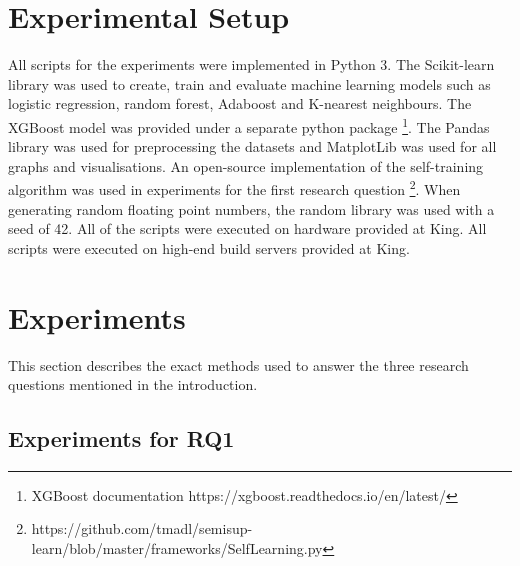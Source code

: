 \documentclass[../main.tex]{subfiles}
\begin{document}
\begin{comment}
    \item \textbf{NUC:}
    According to \cite{kamei2013large}, given that the current commit changed files A,B,C and two previous commits $\alpha, \beta$ such that $\alpha$ altered file A and $\beta$ altered file B, the NUC would be 2.  
    
    \item \textbf{EXP, REXP and SEXP:}
    For a given commit $c$, EXP measures the number of commits made by the author of $c$. REXP is simlar to EXP but adds a weight to each commit by how recently it was made such that recent commits have a higher weight. SEXP is measured by how many changes were made to the subsystems that commit $c$ touched.
    
 
\end{enumerate}

\end{comment}

\section{Experimental Setup}

All scripts for the experiments were implemented in Python 3. The Scikit-learn library was used to create, train and evaluate machine learning models such as logistic regression, random forest, Adaboost and K-nearest neighbours. The XGBoost model was provided under a separate python package \footnote{XGBoost documentation https://xgboost.readthedocs.io/en/latest/}. The Pandas library was used for preprocessing the datasets and MatplotLib was used for all graphs and visualisations. An open-source implementation of the self-training algorithm was used in experiments for the first research question \footnote{https://github.com/tmadl/semisup-learn/blob/master/frameworks/SelfLearning.py}. When generating random floating point numbers, the random library was used with a seed of 42. All of the scripts were executed on hardware provided at King. All scripts were executed on high-end build servers provided at King. 

\section{Experiments}

This section describes the exact methods used to answer the three research questions mentioned in the introduction. 

\subsection{Experiments for RQ1}
\end{document}

